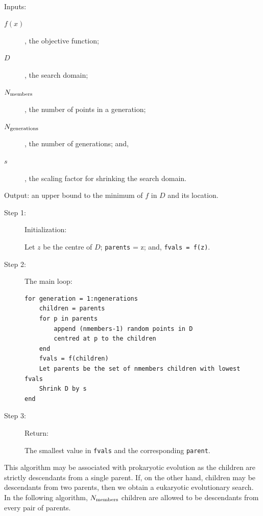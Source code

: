 \begin{algorithm}~\\
Inputs: \begin{description} \item[$f(x)$], the objective function;
\item[$D$], the search domain;
\item[$N_{\rm members}$], the number of points in a generation;
\item[$N_{\rm generations}$], the number of generations; and,
\item[$s$], the scaling factor for shrinking the search domain.
\end{description}
Output: an upper bound to the minimum of $f$ in $D$ and its location.
\begin{description}
\item[Step 1:] Initialization:

Let $z$ be the centre of $D$; {\tt parents} = z; and, {\tt fvals = f(z)}.
\item[Step 2:] The main loop:
\begin{verbatim}
for generation = 1:ngenerations
    children = parents
    for p in parents
        append (nmembers-1) random points in D
        centred at p to the children
    end
    fvals = f(children)
    Let parents be the set of nmembers children with lowest fvals
    Shrink D by s
end    
\end{verbatim}
\item[Step 3:] Return:

The smallest value in {\tt fvals} and the corresponding {\tt parent}.
\end{description}
\end{algorithm}

This algorithm may be associated with prokaryotic evolution as the children are strictly descendants from a single parent. If, on the other hand, children may be descendants from two parents, then we obtain a eukaryotic evolutionary search. In the following algorithm, $N_{\rm members}$ children are allowed to be descendants from every pair of parents.

